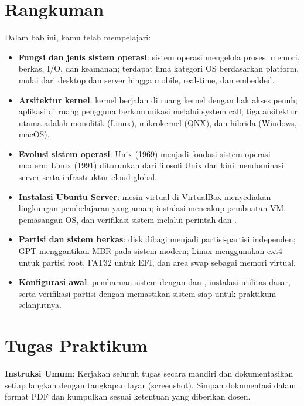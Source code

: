 \section{Rangkuman}
\label{sec:rangkuman}

Dalam bab ini, kamu telah mempelajari:

\begin{itemize}[noitemsep,topsep=2pt]
    \item \textbf{Fungsi dan jenis sistem operasi}: sistem operasi mengelola proses,
    memori, berkas, I/O, dan keamanan; terdapat lima kategori OS berdasarkan platform,
    mulai dari desktop dan server hingga mobile, real-time, dan embedded.
    \item \textbf{Arsitektur kernel}: kernel berjalan di ruang kernel dengan hak akses
    penuh; aplikasi di ruang pengguna berkomunikasi melalui system call; tiga arsitektur
    utama adalah monolitik (Linux), mikrokernel (QNX), dan hibrida (Windows, macOS).
    \item \textbf{Evolusi sistem operasi}: Unix (1969) menjadi fondasi sistem operasi
    modern; Linux (1991) diturunkan dari filosofi Unix dan kini mendominasi server serta
    infrastruktur cloud global.
    \item \textbf{Instalasi Ubuntu Server}: mesin virtual di VirtualBox menyediakan
    lingkungan pembelajaran yang aman; instalasi mencakup pembuatan VM, pemasangan OS,
    dan verifikasi sistem melalui perintah  dan .
    \item \textbf{Partisi dan sistem berkas}: disk dibagi menjadi partisi-partisi
    independen; GPT menggantikan MBR pada sistem modern; Linux menggunakan ext4 untuk
    partisi root, FAT32 untuk EFI, dan area swap sebagai memori virtual.
    \item \textbf{Konfigurasi awal}: pembaruan sistem dengan  dan
    , instalasi utilitas dasar, serta verifikasi partisi dengan
     memastikan sistem siap untuk praktikum selanjutnya.
\end{itemize}

\section{Tugas Praktikum}
\label{sec:tugas}

\textbf{Instruksi Umum}: Kerjakan seluruh tugas secara mandiri dan dokumentasikan setiap
langkah dengan tangkapan layar (screenshot). Simpan dokumentasi dalam format PDF dan
kumpulkan sesuai ketentuan yang diberikan dosen.

